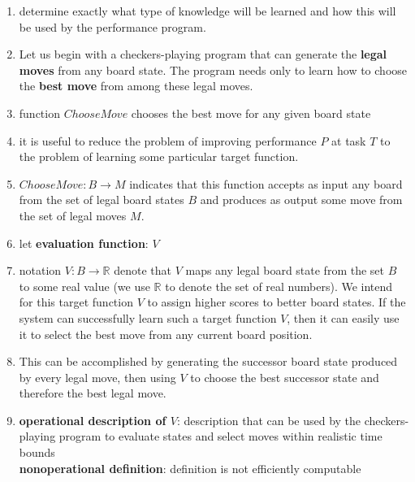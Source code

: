 \begin{enumerate}[itemsep=0.2cm]
    \item determine exactly what type of knowledge will be learned and how this will be used by the performance program.
    \hfill \cite{ml/book/Machine-Learning/Tom-M-Mitchell}

    \item Let us begin with a checkers-playing program that can generate the \textbf{legal moves} from any board state. The program needs only to learn how to choose the \textbf{best move} from among these legal moves.
    \hfill \cite{ml/book/Machine-Learning/Tom-M-Mitchell}

    \item function $ChooseMove$ chooses the best move for any given board state
    \hfill \cite{ml/book/Machine-Learning/Tom-M-Mitchell}

    \item it is useful to reduce the problem of improving performance $P$ at task $T$ to the problem of learning some particular target function.
    \hfill \cite{ml/book/Machine-Learning/Tom-M-Mitchell}

    \item $ChooseMove : B \to M$ indicates that this function accepts as input any board from the set of legal board states $B$ and produces as output some move from the set of legal moves $M$.
    \hfill \cite{ml/book/Machine-Learning/Tom-M-Mitchell}

    \item let \textbf{evaluation function}: $V$
    \hfill \cite{ml/book/Machine-Learning/Tom-M-Mitchell}

    \item notation $V : B \to \mathbb{R}$ denote that $V$ maps any legal board state from the set $B$ to some real value (we use $\mathbb{R}$ to denote the set of real numbers). We intend for this target function $V$ to assign higher scores to better board states. If the system can successfully learn such a target function $V$, then it can easily use it to select the best move from any current board position.
    \hfill \cite{ml/book/Machine-Learning/Tom-M-Mitchell}

    \item This can be accomplished by generating the successor board state produced by every legal move, then using $V$ to choose the best successor state and therefore the best legal move. 
    \hfill \cite{ml/book/Machine-Learning/Tom-M-Mitchell}

    \item \textbf{operational description of $V$}: description that can be used by the checkers-playing program to evaluate states and select moves within realistic time bounds
    \hfill \cite{ml/book/Machine-Learning/Tom-M-Mitchell}
    \\
    \textbf{nonoperational definition}: definition is not efficiently computable
    \hfill \cite{ml/book/Machine-Learning/Tom-M-Mitchell}


\end{enumerate}
